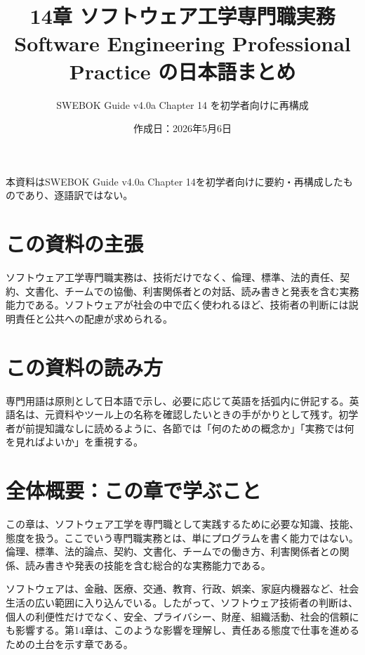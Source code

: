 \documentclass[uplatex,dvipdfmx,a4paper,11pt]{jsarticle}
\title{14章 ソフトウェア工学専門職実務\\\large Software Engineering Professional Practice の日本語まとめ}
\author{SWEBOK Guide v4.0a Chapter 14 を初学者向けに再構成}
\date{作成日：2026年5月6日}
\begin{document}
\maketitle

\begin{center}\small 本資料はSWEBOK Guide v4.0a Chapter 14を初学者向けに要約・再構成したものであり、逐語訳ではない。\end{center}

\section*{この資料の主張}

ソフトウェア工学専門職実務は、技術だけでなく、倫理、標準、法的責任、契約、文書化、チームでの協働、利害関係者との対話、読み書きと発表を含む実務能力である。ソフトウェアが社会の中で広く使われるほど、技術者の判断には説明責任と公共への配慮が求められる。

\section*{この資料の読み方}

専門用語は原則として日本語で示し、必要に応じて英語を括弧内に併記する。英語名は、元資料やツール上の名称を確認したいときの手がかりとして残す。初学者が前提知識なしに読めるように、各節では「何のための概念か」「実務では何を見ればよいか」を重視する。

\tableofcontents

\newpage

\section*{全体概要：この章で学ぶこと}


この章は、ソフトウェア工学を専門職として実践するために必要な知識、技能、態度を扱う。ここでいう専門職実務とは、単にプログラムを書く能力ではない。倫理、標準、法的論点、契約、文書化、チームでの働き方、利害関係者との関係、読み書きや発表の技能を含む総合的な実務能力である。

ソフトウェアは、金融、医療、交通、教育、行政、娯楽、家庭内機器など、社会生活の広い範囲に入り込んでいる。したがって、ソフトウェア技術者の判断は、個人の利便性だけでなく、安全、プライバシー、財産、組織活動、社会的信頼にも影響する。第14章は、このような影響を理解し、責任ある態度で仕事を進めるための土台を示す章である。
\end{document}
